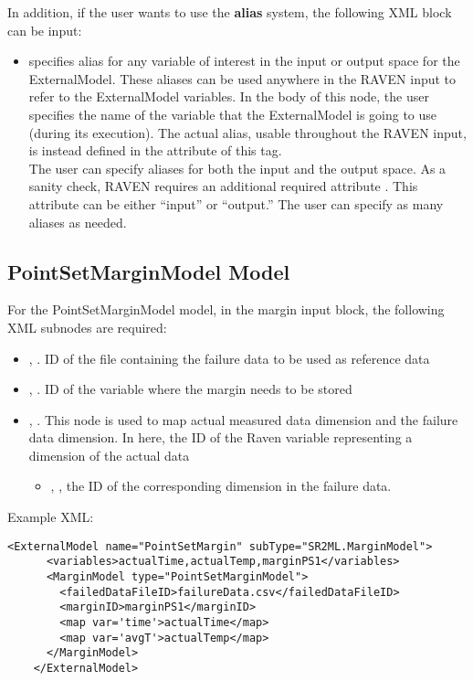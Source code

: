 In addition, if the user wants to use the \textbf{alias} system, the following XML block can be input:
\begin{itemize}
	\item {}  specifies alias for
	any variable of interest in the input or output space for the ExternalModel.
	These aliases can be used anywhere in the RAVEN input to refer to the ExternalModel
	variables.
	In the body of this node, the user specifies the name of the variable that the ExternalModel is
	going to use (during its execution).
	The actual alias, usable throughout the RAVEN input, is instead defined in the
	 attribute of this tag.
	\\The user can specify aliases for both the input and the output space. As a sanity check, RAVEN
	requires an additional required attribute . This attribute can be either ``input'' or ``output.''
	\nb The user can specify as many aliases as needed.
\end{itemize}

\subsection{PointSetMarginModel Model}
For the PointSetMarginModel model, in the margin  input block, the following XML subnodes 
are required:
\begin{itemize}
	\item {}, . ID of the file containing the failure data
	      to be used as reference data
	\item {}, . ID of the variable where the margin needs to be stored
	\item {}, . This node is used to map actual measured data dimension and the 
	      failure data dimension. In here, the ID of the Raven variable representing a dimension of the actual data
	\begin{itemize}
		\item {}, , the ID of the corresponding dimension in the failure data.
	\end{itemize}
\end{itemize}

Example XML:
\begin{lstlisting}[style=XML]
    <ExternalModel name="PointSetMargin" subType="SR2ML.MarginModel">
      <variables>actualTime,actualTemp,marginPS1</variables>
      <MarginModel type="PointSetMarginModel">
        <failedDataFileID>failureData.csv</failedDataFileID>
        <marginID>marginPS1</marginID>
        <map var='time'>actualTime</map>
        <map var='avgT'>actualTemp</map>
      </MarginModel>
    </ExternalModel>
\end{lstlisting}